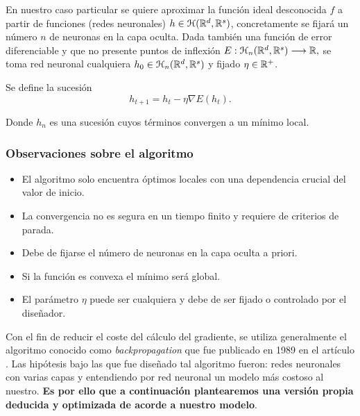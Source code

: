 \reversemarginpar
\setlength{\marginparwidth}{\smallMarginSize}
\normalmarginpar


En nuestro caso particular se quiere aproximar la función ideal desconocida $f$ a partir de funciones (redes neuronales) $h \in \mathcal{H}(\mathbb{R}^d,\mathbb{R}^s)$, concretamente se fijará un número $n$ de neuronas en la capa oculta. 
Dada también una función de error diferenciable y que no presente puntos de inflexión
$E: \mathcal{H}_n(\mathbb{R}^d,\mathbb{R}^s)\longrightarrow \mathbb{R},$
se toma red neuronal cualquiera $h_0 \in \mathcal{H}_n(\mathbb{R}^d,\mathbb{R}^s)$ y 
fijado $\eta \in \mathbb{R}^+$. 

Se define la sucesión 
\begin{equation}\label{eq:descenso-gradiente}
    h_{t+1}  = h_t - \eta \nabla E(h_t).
\end{equation}  

Donde $h_n$ es una sucesión cuyos términos convergen a un mínimo local.
\subsubsection*{Observaciones sobre el algoritmo }
\label{ch05:gradiente-descentente}
\begin{itemize}
    \item El algoritmo solo encuentra óptimos locales con una dependencia crucial del valor de inicio. 
    \item La convergencia no es segura en un tiempo finito y requiere de criterios de parada. 
    \item Debe de fijarse el número de neuronas en la capa oculta a priori.
    \item Si la función es convexa el mínimo será global.
    \item El parámetro $\eta$ puede ser cualquiera y debe de ser fijado o controlado por el diseñador.  
\end{itemize}


Con el fin de reducir el coste del cálculo del gradiente, 
se utiliza generalmente el algoritmo conocido como \textit{backpropagation} que fue publicado en 
1989 en el artículo \cite{backpropagation-Hinton}. Las hipótesis bajo las que fue diseñado tal algoritmo fueron: redes neuronales con varias capas y entendiendo por red neuronal un modelo más costoso al nuestro. \textbf{Es por ello que a continuación plantearemos una versión propia deducida y optimizada de acorde a nuestro modelo}.

